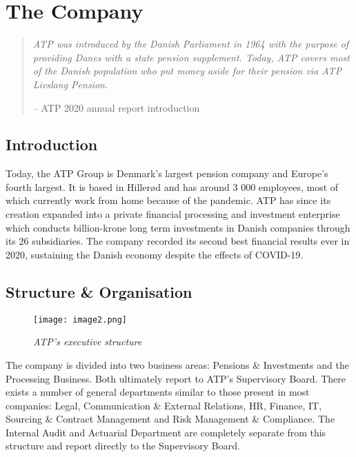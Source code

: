 \section{The Company}

\begin{quote}
    \color{dgreen} \textit{ATP was introduced by the Danish Parliament in 1964 with the purpose of providing Danes with a state pension supplement. Today, ATP covers most of the Danish population who put money aside for their pension via ATP Livslang Pension.}
    
    \color{black}-- ATP 2020 annual report introduction
\end{quote}

\subsection{Introduction}

Today, the ATP Group is Denmark’s largest pension company and Europe’s fourth largest.\cite{top_pension} It is based in Hillerød and has around 3 000 employees, most of which currently work from home because of the pandemic. ATP has since its creation expanded into a private financial processing and investment enterprise which conducts billion-krone long term investments in Danish companies through its 26 subsidiaries. The company recorded its second best financial results ever in 2020, sustaining the Danish economy despite the effects of COVID-19.\cite{about_atp}


\subsection{Structure \& Organisation}

\begin{figure}[H]
    \centering
        \texttt{[image: image2.png]}
        \caption*{\textit{ATP's executive structure\cite{about_atp}}}
\end{figure}

The company is divided into two business areas: Pensions \& Investments and the Processing Business. Both ultimately report to ATP’s Supervisory Board. There exists a number of general departments similar to those present in most companies: Legal, Communication \& External Relations, HR, Finance, IT, Sourcing \& Contract Management and Risk Management \& Compliance. The Internal Audit and Actuarial Department are completely separate from this structure and report directly to the Supervisory Board.\cite{about_atp}

